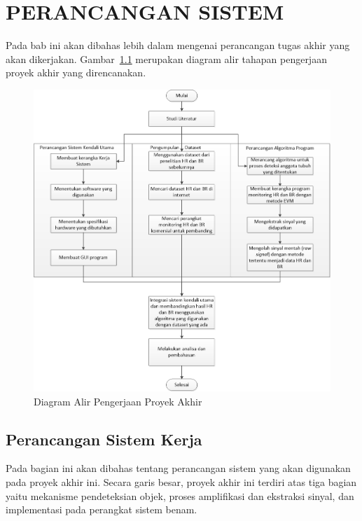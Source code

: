 \chapter{PERANCANGAN SISTEM}

\ifpdf
    \graphicspath{{Chapter3/Figs/Raster/}{Chapter3/Figs/PDF/}{Chapter3/Figs/}}
\else
    \graphicspath{{Chapter3/Figs/Vector/}{Chapter3/Figs/}}
\fi

Pada bab ini akan dibahas lebih dalam mengenai perancangan tugas akhir yang akan dikerjakan. Gambar~\ref{fig:FlowChart} merupakan diagram alir tahapan pengerjaan proyek akhir yang direncanakan. 

\begin{figure}[ht]
 \centering
 \includegraphics[width=\textwidth]{FlowChart}
 \caption{Diagram Alir Pengerjaan Proyek Akhir}
 \label{fig:FlowChart}   
\end{figure}

\section{Perancangan Sistem Kerja}
Pada bagian ini akan dibahas tentang perancangan sistem yang akan digunakan pada proyek akhir ini. Secara garis besar, proyek akhir ini terdiri atas tiga bagian yaitu mekanisme pendeteksian objek, proses amplifikasi dan ekstraksi sinyal,  dan implementasi pada perangkat sistem benam.


